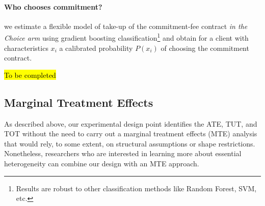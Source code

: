 \documentclass[oneside,11pt]{article}
\begin{document}
{\paragraph{Who chooses commitment?}

we estimate a flexible model of take-up of the commitment-fee contract \textit{in the Choice arm} using gradient boosting classification\footnote{Results are robust to other classification methods like Random Forest, SVM, etc.} and obtain for a client with characteristics $x_i$ a calibrated probability $P(x_i)$ of choosing the commitment contract.

\hl{To be completed}


\subsection{Marginal Treatment Effects}
As described above, our experimental design point identifies the ATE, TUT, and TOT without the need to carry out a marginal treatment effects (MTE) analysis that would rely, to some extent, on structural assumptions or shape restrictions. Nonetheless, researchers who are interested in learning more about essential heterogeneity can combine our design with an MTE approach.





}
\end{document}
